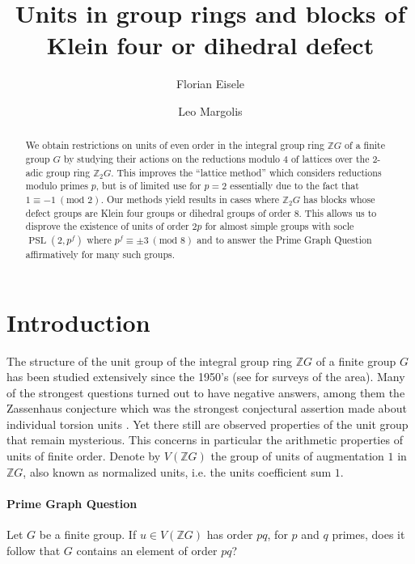 \documentclass[11pt, a4paper]{amsart}
\title{Units in group rings and blocks of Klein four or dihedral defect}
\author{Florian Eisele}
\author{Leo Margolis}
\theoremstyle{definition}
\theoremstyle{definition}
\newcommand{\Z}{\mathbb Z}
\newcommand{\PSL}{{\operatorname{PSL}}}
\begin{document}
\maketitle

\begin{abstract}
We obtain restrictions on units of even order in the integral group ring $\mathbb{Z}G$ of a finite group $G$ by studying their actions on the reductions modulo $4$ of lattices over the $2$-adic group ring $\mathbb{Z}_2G$. This improves the ``lattice method'' which considers reductions modulo primes $p$, but is of limited use for $p=2$ essentially due to the fact that $1\equiv -1 \ (\textrm{mod }2)$. Our methods yield results in cases where $\Z_2 G$ has blocks whose defect groups are Klein four groups or dihedral groups of order $8$. This allows us to disprove the existence of units of order $2p$ for almost simple groups with socle $\PSL(2,p^f)$ where $p^f\equiv \pm 3 \ (\textrm{mod } 8)$ and to answer  the Prime Graph Question affirmatively for many such groups. 
\end{abstract}

\section{Introduction}

The structure of the unit group of the integral group ring $\mathbb{Z}G$ of a finite group $G$ has been studied extensively since the 1950's (see \cite{Sehgal93, MargolisDelRioSurvey} for surveys of the area). Many of the strongest questions turned out to have negative answers, among them the Zassenhaus conjecture which was the strongest conjectural assertion made about individual torsion units \cite{EiseleMargolisZassenhaus}. Yet there still are observed properties of the unit group that remain mysterious. This concerns in particular the arithmetic properties of units of finite order. Denote by $V(\mathbb{Z}G)$ the group of units of augmentation $1$ in $\mathbb{Z}G$, also known as normalized units, i.e. the units coefficient sum $1$.\\

\paragraph*{\textbf{Prime Graph Question}} Let $G$ be a finite group. If $u \in V(\mathbb{Z}G)$ has order $pq$, for $p$ and $q$ primes, does it follow that $G$ contains an element of order $pq$?\\
\end{document}
